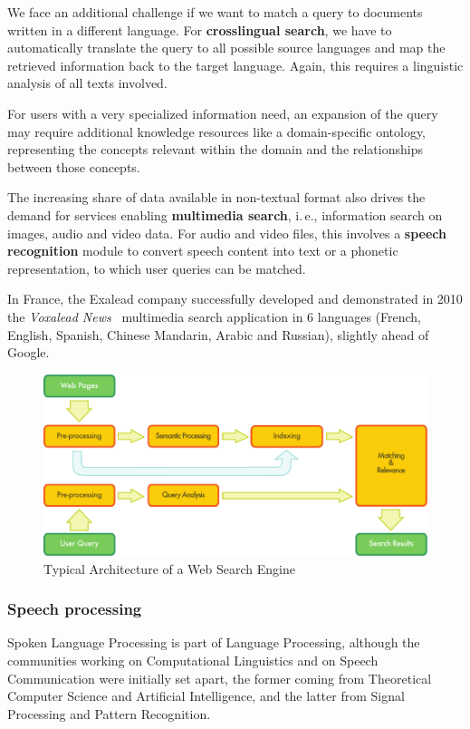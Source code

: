 \begin{multicols}{2}
We face an additional challenge if we want to match a query to
documents written in a different language. For {\bf crosslingual search}, we
have to automatically translate the query to all possible source
languages and map the retrieved information back to the target
language. Again, this requires a linguistic analysis of all texts
involved.

For users with a very specialized information need, an expansion of
the query may require additional knowledge resources like a
domain-specific ontology, representing the concepts relevant within
the domain and the relationships between those concepts.

The increasing share of data available in non-textual format also
drives the demand for services enabling {\bf multimedia search}, i.\,e.,
information search on images, audio and video data. For audio and
video files, this involves a {\bf speech recognition} module to convert
speech content into text or a phonetic representation, to which user
queries can be matched.

In France, the Exalead company successfully developed and demonstrated
in 2010 the {\em Voxalead News}~\cite{voxaleadnews} multimedia search
application in 6 languages (French, English, Spanish, Chinese
Mandarin, Arabic and Russian), slightly ahead of Google.

\begin{figure}[!ht]
\begin{center}
 \includegraphics[width=\width]{../_media/english/web_search_architecture}
 \caption{Typical Architecture of a Web Search Engine}
\label{fig:archiwebEn}
\end{center}
\end{figure}

\subsubsection{Speech processing} 
Spoken Language Processing is part of Language Processing, although
the communities working on Computational Linguistics and on Speech
Communication were initially set apart, the former coming from
Theoretical Computer Science and Artificial Intelligence, and the
latter from Signal Processing and Pattern Recognition.


\end{multicols}
